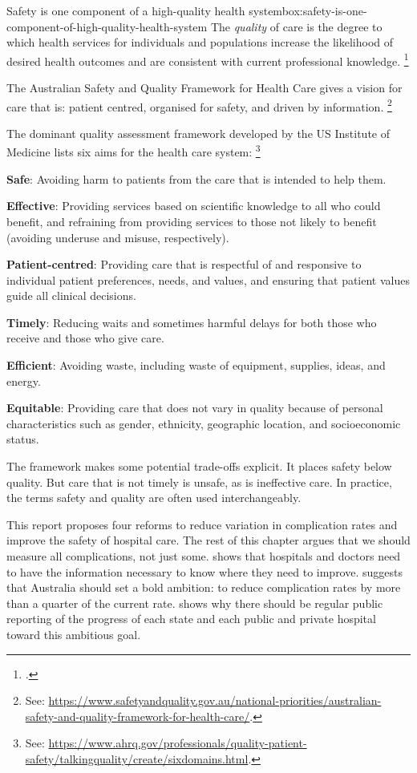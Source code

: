 \documentclass[FrontPage]{grattan}
\begin{document}
\begin{bigbox*}{Safety is one component of a high-quality health system}{box:safety-is-one-component-of-high-quality-health-system}
The \emph{quality} of care is the degree to which health services for individuals and populations increase the likelihood of desired health outcomes and are consistent with current professional knowledge.%
	\footcite{Runciman_2009}

The Australian Safety and Quality Framework for Health Care gives a vision for care that is: patient centred, organised for safety, and driven by information.%
	\footnote{See: \textcolor{blue}{\url{https://www.safetyandquality.gov.au/national-priorities/australian-safety-and-quality-framework-for-health-care/}}.}

The dominant quality assessment framework developed by the US Institute of Medicine lists six aims for the health care system:%
	\footnote{See: \textcolor{blue}{\url{https://www.ahrq.gov/professionals/quality-patient-safety/talkingquality/create/sixdomains.html}}.}

\textbf{Safe}: Avoiding harm to patients from the care that is intended to help them.

\textbf{Effective}: Providing services based on scientific knowledge to all who could benefit, and refraining from providing services to those not likely to benefit (avoiding underuse and misuse, respectively).

\textbf{Patient-centred}: Providing care that is respectful of and responsive to individual patient preferences, needs, and values, and ensuring that patient values guide all clinical decisions.

\textbf{Timely}: Reducing waits and sometimes harmful delays for both those who receive and those who give care.

\textbf{Efficient}: Avoiding waste, including waste of equipment, supplies, ideas, and energy.

\textbf{Equitable}: Providing care that does not vary in quality because of personal characteristics such as gender, ethnicity, geographic location, and socioeconomic status.

The framework makes some potential trade-offs explicit.
It places safety below quality.
But care that is not timely is unsafe, as is ineffective care.
In practice, the terms safety and quality are often used interchangeably.
\end{bigbox*}

This report proposes four reforms to reduce variation in complication rates and improve the safety of hospital care.
The rest of this chapter argues that we should measure all complications, not just some.
 shows that hospitals and doctors need to have the information necessary to know where they need to improve.
 suggests that Australia should set a bold ambition: to reduce complication rates by more than a quarter of the current rate.
 shows why there should be regular public reporting of the progress of each state and each public and private hospital toward this ambitious goal.
\end{document}
